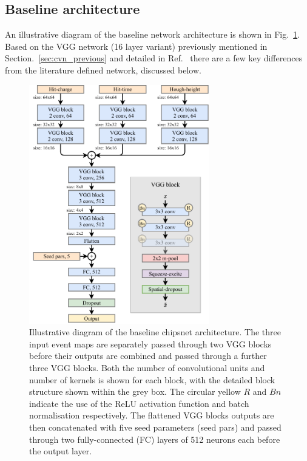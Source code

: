 \subsection{Baseline architecture} %
\label{sec:cvn_baseline_arch} %

An illustrative diagram of the baseline network architecture is shown in Fig.~\ref{fig:chipsnet}.
Based on the VGG network (16 layer variant) previously mentioned in
Section.~\ref{sec:cvn_previous} and detailed in Ref.~\cite{simonyan2014} there are a few key
differences from the literature defined network, discussed below.

\begin{figure} %
    \includegraphics[width=0.7\textwidth]{diagrams/6-cvn/chipsnet.pdf}
    \caption[chipsnet short]
    {Illustrative diagram of the baseline chipsnet architecture. The three input event maps are
        separately passed through two VGG blocks before their outputs are combined and passed
        through a further three VGG blocks. Both the number of convolutional units and number of
        kernels is shown for each block, with the detailed block structure shown within the grey
        box. The circular yellow $R$ and $Bn$ indicate the use of the ReLU activation function and
        batch normalisation respectively. The flattened VGG blocks outputs are then concatenated
        with five seed parameters (seed pars) and passed through two fully-connected (FC) layers
        of 512 neurons each before the output layer.}
    \label{fig:chipsnet}
\end{figure}

